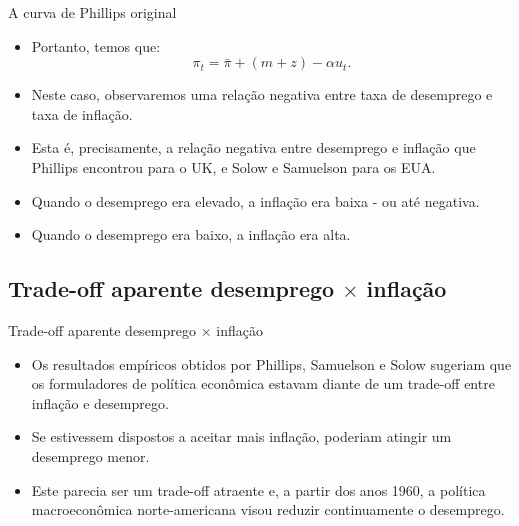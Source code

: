 \documentclass[10pt]{beamer}
\begin{document}
\begin{frame}{A curva de Phillips original}
    \begin{itemize}
        \item Portanto, temos que:
        \begin{equation}
        \pi_t = \bar{\pi} + (m + z) - \alpha u_t.
        \label{eq7}
        \end{equation}
        \bigskip
        \item Neste caso, observaremos uma relação negativa entre taxa de desemprego e taxa de inflação.
        \bigskip
        \item Esta é, precisamente, a relação negativa entre desemprego e inflação que Phillips encontrou para o UK, e Solow e Samuelson para os EUA.
        \bigskip
        \item Quando o desemprego era elevado, a inflação era baixa - ou até negativa.
        \bigskip
        \item Quando o desemprego era baixo, a inflação era alta.
    \end{itemize}
\end{frame}

\subsection{Trade-off aparente desemprego $\times$ inflação}
\begin{frame}{Trade-off aparente desemprego $\times$ inflação}
    \begin{itemize}
        \item Os resultados empíricos obtidos por Phillips, Samuelson e Solow sugeriam que os formuladores de política econômica estavam diante de um trade-off entre inflação e desemprego.
        \bigskip
        \item Se estivessem dispostos a aceitar mais inflação, poderiam atingir um desemprego menor.
        \bigskip
        \item Este parecia ser um trade-off atraente e, a partir dos anos 1960, a política macroeconômica norte-americana visou reduzir continuamente o desemprego. 
    \end{itemize}
\end{frame}
\end{document}
